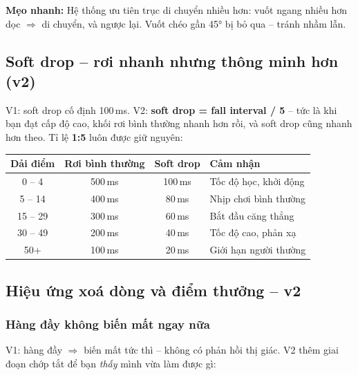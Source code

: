 \documentclass[12pt,a4paper]{article}
\renewcommand{\tipbox}[1]{%
  \vspace{4pt}%
  \noindent\colorbox{yellow!18}{\begin{minipage}{0.96\linewidth}%
    \vspace{2pt}\textbf{Mẹo nhanh:} #1\vspace{2pt}%
  \end{minipage}}%
  \vspace{4pt}%
}
\begin{document}
\tipbox{Hệ thống ưu tiên trục di chuyển nhiều hơn: vuốt ngang nhiều hơn dọc
$\Rightarrow$ di chuyển, và ngược lại. Vuốt chéo gần 45° bị bỏ qua --
tránh nhầm lẫn.}

\subsection{Soft drop -- rơi nhanh nhưng thông minh hơn (v2)}

V1: soft drop cố định 100\,ms. V2: \textbf{soft drop = fall interval / 5} --
tức là khi bạn đạt cấp độ cao, khối rơi bình thường nhanh hơn rồi, và
soft drop cũng nhanh hơn theo. Tỉ lệ \textbf{1:5} luôn được giữ nguyên:

\vspace{4pt}
\begin{tabularx}{\linewidth}{|c|c|c|X|}
    \hline
    \textbf{Dải điểm} & \textbf{Rơi bình thường} & \textbf{Soft drop} & \textbf{Cảm nhận} \\
    \hline
    0 -- 4   & 500\,ms & 100\,ms & Tốc độ học, khởi động \\
    \hline
    5 -- 14  & 400\,ms &  80\,ms & Nhịp chơi bình thường \\
    \hline
    15 -- 29 & 300\,ms &  60\,ms & Bắt đầu căng thẳng \\
    \hline
    30 -- 49 & 200\,ms &  40\,ms & Tốc độ cao, phản xạ \\
    \hline
    50+      & 100\,ms &  20\,ms & Giới hạn người thường \\
    \hline
\end{tabularx}

\subsection{Hiệu ứng xoá dòng và điểm thưởng -- v2}

\subsubsection{Hàng đầy không biến mất ngay nữa}

V1: hàng đầy $\Rightarrow$ biến mất tức thì -- không có phản hồi thị giác.
V2 thêm giai đoạn chớp tắt để bạn \textit{thấy} mình vừa làm được gì:
\end{document}
